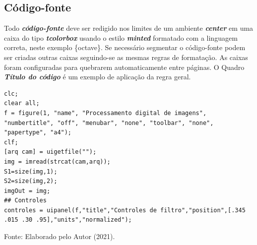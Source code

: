 \documentclass[11pt, a4paper]{article}
\begin{document}
\begin{onecolumn}
\subsection*{Código-fonte}
Todo \textbf{\textit{código-fonte}} deve ser redigido nos limites de um ambiente \textbf{\textit{center}} em uma caixa do tipo \textbf{\textit{tcolorbox}} usando o estilo \textbf{\textit{minted}} formatado com a linguagem correta, neste exemplo \{octave\}.
Se necessário segmentar o código-fonte podem ser criadas outras caixas seguindo-se as mesmas regras de formatação. As caixas foram configuradas para quebrarem automaticamente entre páginas. O Quadro \textbf{\textit{Título do código}} é um exemplo de aplicação da regra geral.
\begin{center}
    \begin{tcolorbox}[enhanced, breakable, title={Título do código}, width=0.95\textwidth, colbacktitle=gray!15!, coltitle=black, colback=white!0]
        \begin{verbatim}
clc;
clear all;
f = figure(1, "name", "Processamento digital de imagens", "numbertitle", "off", "menubar", "none", "toolbar", "none", "papertype", "a4");
clf;
[arq cam] = uigetfile("");
img = imread(strcat(cam,arq));
S1=size(img,1);
S2=size(img,2);
imgOut = img;
## Controles
controles = uipanel(f,"title","Controles de filtro","position",[.345 .015 .30 .95],"units","normalized");
        \end{verbatim}
    \end{tcolorbox}
\end{center}
\hspace{0.025\textwidth} %
\small{Fonte: Elaborado pelo Autor (2021).}
\end{onecolumn}
\end{document}
